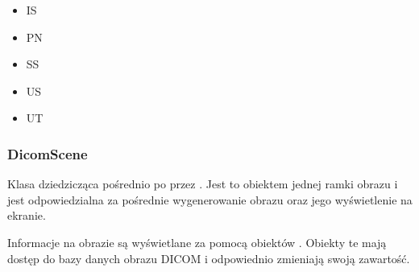 \begin{itemize}
    \item IS
    \item PN
    \item SS
    \item US    
    \item UT
\end{itemize}

\subsubsection{DicomScene}

Klasa dziedzicząca pośrednio po  przez .
Jest to obiektem jednej ramki obrazu i jest odpowiedzialna za pośrednie wygenerowanie obrazu oraz jego wyświetlenie na ekranie.

Informacje na obrazie są wyświetlane za pomocą obiektów .
Obiekty te mają dostęp do bazy danych obrazu DICOM i odpowiednio zmieniają swoją zawartość.


